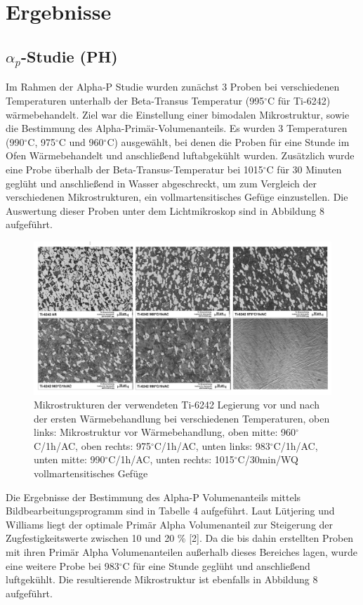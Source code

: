 \chapter {Ergebnisse}

\section{$\alpha_p$-Studie (PH)}

Im Rahmen der Alpha-P Studie wurden zunächst 3 Proben bei verschiedenen Temperaturen unterhalb der Beta-Transus Temperatur (995$^\circ$C für Ti-6242) wärmebehandelt. Ziel war die Einstellung einer bimodalen Mikrostruktur, sowie die Bestimmung des Alpha-Primär-Volumenanteils. Es wurden 3 Temperaturen (990$^\circ$C, 975$^\circ$C und 960$^\circ$C) ausgewählt, bei denen die Proben für eine Stunde im Ofen Wärmebehandelt und anschließend luftabgekühlt wurden. Zusätzlich wurde eine Probe überhalb der Beta-Transus-Temperatur bei 1015$^\circ$C für 30 Minuten geglüht und anschließend in Wasser abgeschreckt, um zum Vergleich der verschiedenen Mikrostrukturen, ein vollmartensitisches Gefüge einzustellen. Die Auswertung dieser Proben unter dem Lichtmikroskop sind in Abbildung 8 aufgeführt. 

\begin{figure}[h]
	\centering
	\includegraphics[width=0.9\linewidth]{"Bilder/Abbildung 8"}
	\caption[Abbildung 8]{Mikrostrukturen der verwendeten Ti-6242 Legierung vor und nach der ersten Wärmebehandlung bei verschiedenen Temperaturen, oben links: Mikrostruktur vor Wärmebehandlung, oben mitte: 960$^\circ$C/1h/AC, oben rechts: 975$^\circ$C/1h/AC, unten links: 983$^\circ$C/1h/AC, unten mitte: 990$^\circ$C/1h/AC, unten rechts: 1015$^\circ$C/30min/WQ vollmartensitisches Gefüge}
	\label{fig:abbildung-8}
\end{figure}

Die Ergebnisse der Bestimmung des Alpha-P Volumenanteils mittels Bildbearbeitungsprogramm sind in Tabelle 4 aufgeführt. Laut Lütjering und Williams liegt der optimale Primär Alpha Volumenanteil zur Steigerung der Zugfestigkeitswerte zwischen 10 und 20 \% [2]. Da die bis dahin erstellten Proben mit ihren Primär Alpha Volumenanteilen außerhalb dieses Bereiches lagen, wurde eine weitere Probe bei 983$^\circ$C für eine Stunde geglüht und anschließend luftgekühlt. Die resultierende Mikrostruktur ist ebenfalls in Abbildung 8 aufgeführt.

